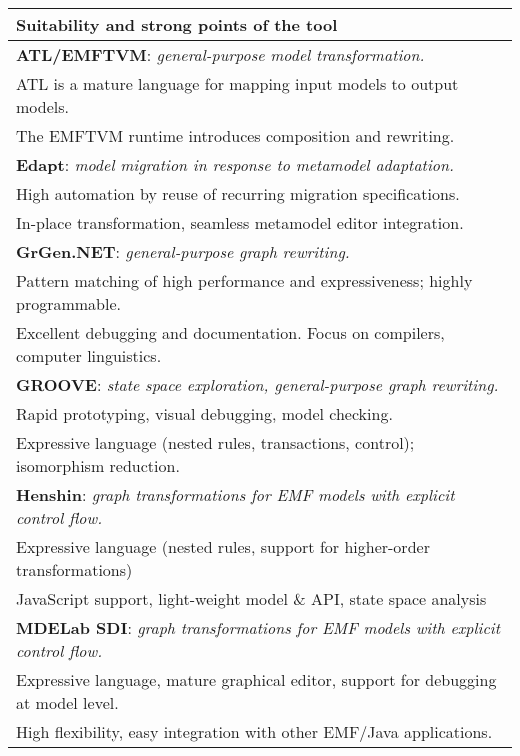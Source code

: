 \begin{table}[ht]
\begin{center}
\begin{tabular}{l}
\hline
\textbf{Suitability and strong points of the tool} \\ \hline

\textbf{ATL/EMFTVM}: \textit{general-purpose model transformation.} \\
ATL is a mature language for mapping input models to output models. \\
The EMFTVM runtime introduces composition and rewriting.  \\ \hline

\textbf{Edapt}: \textit{model migration in response to metamodel adaptation.} \\
High automation by reuse of recurring migration specifications. \\
In-place transformation, seamless metamodel editor integration.  \\ \hline

\textbf{GrGen.NET}: \textit{general-purpose graph rewriting.} \\
Pattern matching of high performance and expressiveness; highly programmable. \\
Excellent debugging and documentation. Focus on compilers, computer linguistics. \\ \hline

\textbf{GROOVE}: \textit{state space exploration, general-purpose graph rewriting.} \\
Rapid prototyping, visual debugging, model checking. \\
Expressive language (nested rules, transactions, control); isomorphism reduction.  \\ \hline

\textbf{Henshin}: \textit{graph transformations for EMF models with explicit control flow.} \\
Expressive language (nested rules, support for higher-order transformations) \\
JavaScript support, light-weight model \& API, state space analysis  \\ \hline

\textbf{MDELab SDI}: \textit{graph transformations for EMF models with explicit control flow.} \\
Expressive language, mature graphical editor, support for debugging at model level. \\
High flexibility, easy integration with other EMF/Java applications.  \\ \hline


\end{tabular}
\end{center}
\end{table}
